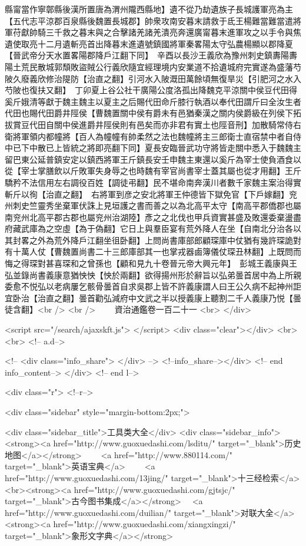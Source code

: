 縣甯當作寧鄣縣後漢所置唐為渭州隴西縣地】遺不從乃劫遺族子長城護軍亮為主【五代志平涼郡百泉縣後魏置長城郡】帥衆攻南安暮末請救于氐王楊難當難當遣將軍苻獻帥騎三千救之暮末與之合擊諸羌諸羌潰亮奔還廣甯暮末進軍攻之以手令與焦遺使取亮十二月遺斬亮首出降暮末進遺號鎮國將軍秦畧陽太守弘農楊顯以郡降夏【晉武帝分天水置畧陽郡降戶江翻下同】　辛酉以長沙王義欣為豫州刺史鎮夀陽夀陽土荒民散城郭頹敗盜賊公行義欣隨宜經理境内安業道不拾遺城府完實遂為盛藩芍陂久廢義欣修治隄防【治直之翻】引河水入陂溉田萬餘頃無復旱災【引肥河之水入芍陂也復扶又翻】　丁卯夏上谷公社干廣陽公度洛孤出降魏克平涼關中侯豆代田得奚斤娥清等獻于魏主魏主以夏主之后賜代田命斤膝行執酒以奉代田謂斤曰全汝生者代田也賜代田爵井陘侯【曹魏置關中侯有爵未有邑猶秦漢之關内侯爵級在列侯下拓拔賞豆代田自關中侯進爵井陘侯則有邑矣而亦非君有實土也陘音刑】加散騎常侍右衛將軍領内都幢將【百人為幢幢有帥柔然之法也魏幢將主三郎衛士直宿禁中者自侍中已下中散已上皆統之將即亮翻下同】夏長安臨晉武功守將皆走關中悉入于魏魏主留巴東公延普鎮安定以鎮西將軍王斤鎮長安壬申魏主東還以奚斤為宰士使負酒食以從【宰士掌膳飲以斤敗軍失身辱之也時魏有宰官尚書宰士蓋其屬也從才用翻】王斤驕矜不法信用左右調役百姓【調徒弔翻】民不堪命南奔漢川者數千家魏主案治得實斬斤以徇【治直之翻】　右將軍到彦之安北將軍王仲德皆下獄免官【下戶嫁翻】兖州刺史竺靈秀坐棄軍伏誅上見垣護之書而善之以為北高平太守【南高平郡僑郡也屬南兖州北高平郡古郡也屬兖州治湖陸】彥之之北伐也甲兵資實甚盛及敗還委棄盪盡府藏武庫為之空虛【為于偽翻】它日上與羣臣宴有荒外降人在坐【自南北分治各以其封畧之外為荒外降戶江翻坐徂卧翻】上問尚書庫部郎顧琛庫中仗猶有幾許琛詭對有十萬人仗【曹魏置尚書二十三郎庫部其一也掌戎器鹵簿儀仗琛丑林翻】上既問而悔之得琛對甚喜琛和之曾孫也【顧和見九十卷晉元帝大興元年】　彭城王義康與王弘並錄尚書義康意猶怏怏【怏於兩翻】欲得揚州形於辭旨以弘弟曇首居中為上所親委愈不悦弘以老病屢乞骸骨曇首自求吳郡上皆不許義康謂人曰王公久病不起神州詎宜卧治【治直之翻】曇首勸弘減府中文武之半以授義康上聽割二千人義康乃悦【曇徒含翻】<br />
<br />
　　資治通鑑卷一百二十一  <br>
   </div> 

<script src="/search/ajaxskft.js"> </script>
 <div class="clear"></div>
<br>
<br>
 <!-- a.d-->

 <!--
<div class="info_share">
</div> 
-->
 <!--info_share--></div>   <!-- end info_content-->
  </div> <!-- end l-->

<div class="r">   <!--r-->



<div class="sidebar"  style="margin-bottom:2px;">

 
<div class="sidebar_title">工具类大全</div>
<div class="sidebar_info">
<strong><a href="http://www.guoxuedashi.com/lsditu/" target="_blank">历史地图</a></strong>　　
<a href="http://www.880114.com/" target="_blank">英语宝典</a>　　
<a href="http://www.guoxuedashi.com/13jing/" target="_blank">十三经检索</a>　
<br><strong><a href="http://www.guoxuedashi.com/gjtsjc/" target="_blank">古今图书集成</a></strong>　
<a href="http://www.guoxuedashi.com/duilian/" target="_blank">对联大全</a>　<strong><a href="http://www.guoxuedashi.com/xiangxingzi/" target="_blank">象形文字典</a></strong>　

